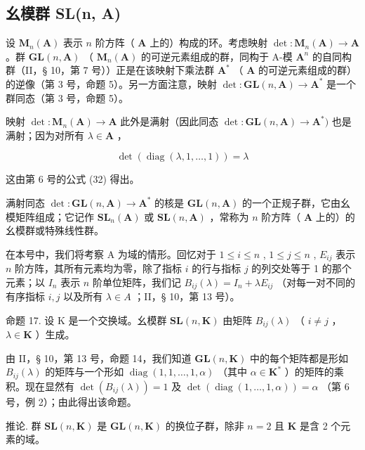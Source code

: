 \subsection{幺模群 SL(n, A)}

设 \(\mathbf{M}_n(\mathbf{A})\) 表示 \(n\) 阶方阵（ \(\mathbf{A}\) 上的）构成的环。考虑映射 \(\det: \mathbf{M}_n(\mathbf{A}) \to \mathbf{A}\) 。群 \(\mathbf{GL}(n, \mathbf{A})\) （ \(\mathbf{M}_n(\mathbf{A})\) 的可逆元素组成的群，同构于 A-模 \(\mathbf{A}^n\) 的自同构群（II，§ 10，第 7 号））正是在该映射下乘法群 \(\mathbf{A}^*\) （ \(\mathbf{A}\) 的可逆元素组成的群）的逆像（第 3 号，命题 5）。另一方面注意，映射 \(\det: \mathbf{GL}(n, \mathbf{A}) \to \mathbf{A}^*\) 是一个群同态（第 3 号，命题 5）。

映射 \(\operatorname{det}:\mathbf{M}_n(\mathbf{A})\to \mathbf{A}\) 此外是满射（因此同态 \(\operatorname{det}:\mathbf{GL}(n,\mathbf{A})\to \mathbf{A}^*)\) 也是满射；因为对所有 \(\lambda \in \mathbf{A}\) ，

\[
\det (\operatorname{diag} (\lambda , 1, \dots , 1)) = \lambda
\]

这由第 6 号的公式 (32) 得出。

满射同态 \(\operatorname{det}:\mathbf{GL}(n,\mathbf{A})\to \mathbf{A}^*\) 的核是 \(\mathbf{GL}(n,\mathbf{A})\) 的一个正规子群，它由幺模矩阵组成；它记作 \(\mathbf{SL}_n(\mathbf{A})\) 或 \(\mathbf{SL}(n,\mathbf{A})\) ，常称为 \(n\) 阶方阵（ \(\mathbf{A}\) 上的）的幺模群或特殊线性群。

在本号中，我们将考察 A 为域的情形。回忆对于 \(1 \leqslant i \leqslant n\) , \(1 \leqslant j \leqslant n\) , \(E_{ij}\) 表示 \(n\) 阶方阵，其所有元素均为零，除了指标 \(i\) 的行与指标 \(j\) 的列交处等于 1 的那个元素；以 \(I_n\) 表示 \(n\) 阶单位矩阵，我们记 \(B_{ij}(\lambda) = I_n + \lambda E_{ij}\) （对每一对不同的有序指标 \(i, j\) 以及所有 \(\lambda \in A\) ；II，§ 10，第 13 号）。

命题 17. 设 K 是一个交换域。幺模群 \(\mathbf{SL}(n, \mathbf{K})\) 由矩阵 \(B_{ij}(\lambda)\) （ \(i \neq j\) ， \(\lambda \in \mathbf{K}\) ）生成。

由 II，§ 10，第 13 号，命题 14，我们知道 \(\mathbf{GL}(n,\mathbf{K})\) 中的每个矩阵都是形如 \(B_{ij}(\lambda)\) 的矩阵与一个形如 \(\operatorname{diag}(1,1,\ldots,1,\alpha)\) （其中 \(\alpha\in\mathbf{K}^{*}\) ）的矩阵的乘积。现在显然有 \(\det(B_{ij}(\lambda))=1\) 及 \(\det(\operatorname{diag}(1,\ldots,1,\alpha))=\alpha\) （第 6 号，例 2）；由此得出该命题。

推论. 群 \(\mathbf{SL}(n, \mathbf{K})\) 是 \(\mathbf{GL}(n, \mathbf{K})\) 的换位子群，除非 \(n = 2\) 且 \(\mathbf{K}\) 是含 2 个元素的域。

